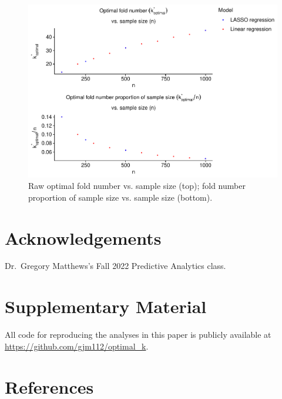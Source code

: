 \documentclass[
  12pt,
]{article}
\begin{document}
\begin{figure}[H]

{\centering \includegraphics{manuscript_files/figure-latex/unnamed-chunk-9-1} 

}

\caption{Raw optimal fold number vs. sample size (top); fold number proportion of sample size vs. sample size (bottom).}\label{fig:unnamed-chunk-9}
\end{figure}

\hypertarget{acknowledgements}{%
\section*{Acknowledgements}\label{acknowledgements}}

Dr.~Gregory Matthews's Fall 2022 Predictive Analytics class.

\hypertarget{supplementary-material}{%
\section*{Supplementary Material}\label{supplementary-material}}

All code for reproducing the analyses in this paper is publicly
available at \url{https://github.com/gjm112/optimal_k}.

\hypertarget{references}{%
\section*{References}\label{references}}
\end{document}
